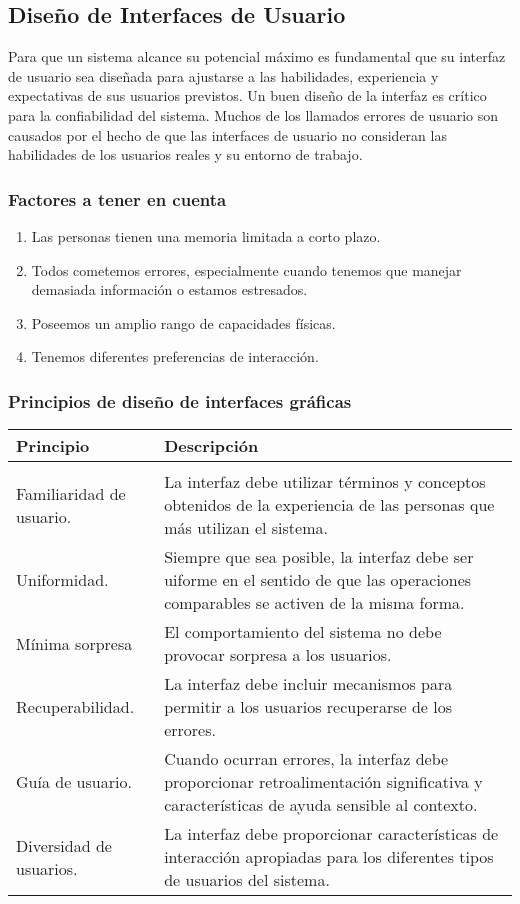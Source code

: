 \subsection{Diseño de Interfaces de Usuario}
Para que un sistema alcance su potencial máximo es fundamental que su interfaz de usuario sea diseñada para ajustarse a las habilidades, experiencia y expectativas de sus usuarios previstos. Un buen diseño de la interfaz es crítico para la confiabilidad del sistema. Muchos de los llamados errores de usuario son causados por el hecho de que las interfaces de usuario no consideran las habilidades de los usuarios reales y su entorno de trabajo.\\
\subsubsection{Factores a tener en cuenta}
\begin{enumerate}
\item Las personas tienen una memoria limitada a corto plazo.
\item Todos cometemos errores, especialmente cuando tenemos que manejar demasiada información o estamos estresados.
\item Poseemos un amplio rango de capacidades físicas.
\item Tenemos diferentes preferencias de interacción.
\end{enumerate}
\subsubsection{Principios de diseño de interfaces gráficas}
\begin{center}
\begin{tabu}{p{7cm}|p{7cm}}
\rowfont{\bfseries\itshape\large} Principio & Descripción\\
\hline
\\[2pt]

Familiaridad de usuario. &
La interfaz debe utilizar términos y conceptos obtenidos de la experiencia de las personas que más utilizan el sistema.\\[2pt]
Uniformidad. &
Siempre que sea posible, la interfaz debe ser uiforme en el sentido de que las operaciones comparables se activen de la misma forma.\\[2pt]
Mínima sorpresa &
El comportamiento del sistema no debe provocar sorpresa a los usuarios.\\[2pt]
Recuperabilidad. &
La interfaz debe incluir mecanismos para permitir a los usuarios recuperarse de los errores.\\[2pt]
Guía de usuario. &
Cuando ocurran errores, la interfaz debe proporcionar retroalimentación significativa y características de ayuda sensible al contexto.\\[2pt]
Diversidad de usuarios. &
La interfaz debe proporcionar características de interacción apropiadas para los diferentes tipos de usuarios del sistema.
\end{tabu}
\end{center}

